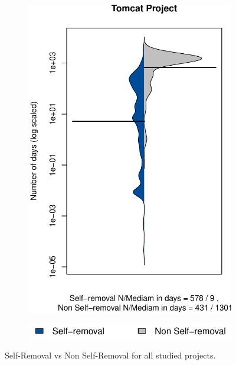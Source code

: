 \begin{figure}[t]
\begin{subfigure}[b]{0.195\textwidth}
		\includegraphics[width=\textwidth]{figures/test/Tomcat.pdf}
		\label{fig:removal_comparison_tomcat} 
	\end{subfigure}
	\begin{subfigure}[b]{0.30\textwidth}
		\includegraphics[width=\textwidth]{figures/test/legend_.pdf}
	\end{subfigure}
	\caption{Self-Removal vs Non Self-Removal for all studied projects.}
	\label{fig:removal_self_vs_nonself}
\end{figure}





